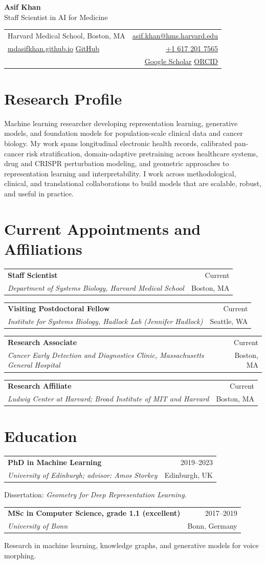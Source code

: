 \documentclass[10pt,a4paper]{article}
\makeatletter
\newcommand{\entry}[4]{%
  \par\noindent\begin{tabularx}{\textwidth}{@{}Xr@{}}
    \textbf{#1} & \color{muted}#2 \\
    \textit{#3} & \color{muted}#4
  \end{tabularx}\par\vspace{3pt}
}
\makeatother
\begin{document}
{\Huge\bfseries Asif Khan}\\[3pt]
{\large\color{accent}Staff Scientist in AI for Medicine}\\[7pt]
\begin{tabularx}{\textwidth}{@{}Xr@{}}
Harvard Medical School, Boston, MA & \href{mailto:asif.khan@hms.harvard.edu}{asif.khan@hms.harvard.edu} \\
\href{https://mdasifkhan.github.io/}{mdasifkhan.github.io} \quad
\href{https://github.com/MdAsifKhan}{GitHub} & \href{tel:+16172017565}{+1 617 201 7565} \\
&
\href{https://scholar.google.com/citations?user=Akp4gEwAAAAJ}{Google Scholar} \quad
\href{https://orcid.org/0000-0003-3179-0140}{ORCID}
\end{tabularx}

\section{Research Profile}
Machine learning researcher developing representation learning, generative models, and foundation models for population-scale clinical data and cancer biology. My work spans longitudinal electronic health records, calibrated pan-cancer risk stratification, domain-adaptive pretraining across healthcare systems, drug and CRISPR perturbation modeling, and geometric approaches to representation learning and interpretability. I work across methodological, clinical, and translational collaborations to build models that are scalable, robust, and useful in practice.

\section{Current Appointments and Affiliations}
\entry{Staff Scientist}{Current}{Department of Systems Biology, Harvard Medical School}{Boston, MA}
\entry{Visiting Postdoctoral Fellow}{Current}{Institute for Systems Biology, Hadlock Lab (Jennifer Hadlock)}{Seattle, WA}
\entry{Research Associate}{Current}{Cancer Early Detection and Diagnostics Clinic, Massachusetts General Hospital}{Boston, MA}
\entry{Research Affiliate}{Current}{Ludwig Center at Harvard; Broad Institute of MIT and Harvard}{Boston, MA}

\section{Education}
\entry{PhD in Machine Learning}{2019--2023}{University of Edinburgh; advisor: Amos Storkey}{Edinburgh, UK}
Dissertation: \textit{Geometry for Deep Representation Learning}.
\entry{MSc in Computer Science, grade 1.1 (excellent)}{2017--2019}{University of Bonn}{Bonn, Germany}
Research in machine learning, knowledge graphs, and generative models for voice morphing.
\end{document}
